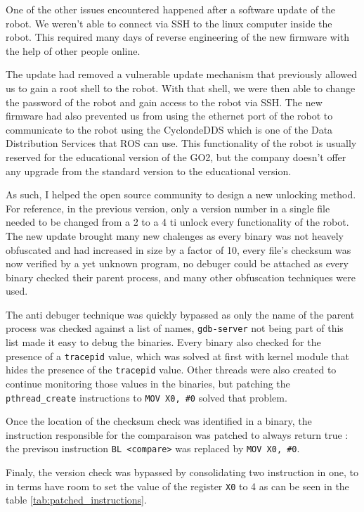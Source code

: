 \documentclass[11pt]{article}
\begin{document}
        One of the other issues encountered happened after a software update of the robot. We weren't able to connect via SSH to the linux computer inside the robot. This required many days of reverse engineering of the new firmware with the help of other people online.

        The update had removed a vulnerable update mechanism that previously allowed us to gain a root shell to the robot. With that shell, we were then able to change the password of the robot and gain access to the robot via SSH. The new firmware had also prevented us from using the ethernet port of the robot to communicate to the robot using the CyclondeDDS which is one of the Data Distribution Services that ROS can use. This functionality of the robot is usually reserved for the educational version of the GO2, but the company doesn't offer any upgrade from the standard version to the educational version.

        As such, I helped the open source community to design a new unlocking method. For reference, in the previous version, only a version number in a single file needed to be changed from a 2 to a 4 ti unlock every functionality of the robot. The new update brought many new chalenges as every binary was not heavely obfuscated and had increased in size by a factor of 10, every file's checksum was now verified by a yet unknown program, no debuger could be attached as every binary checked their parent process, and many other obfuscation techniques were used.

        The anti debuger technique was quickly bypassed as only the name of the parent process was checked against a list of names, \texttt{gdb-server} not being part of this list made it easy to debug the binaries. Every binary also checked for the presence of a \texttt{tracepid} value, which was solved at first with kernel module that hides the presence of the \texttt{tracepid} value. Other threads were also created to continue monitoring those values in the binaries, but patching the \texttt{pthread\_create} instructions to \texttt{MOV X0, \#0} solved that problem.

        Once the location of the checksum check was identified in a binary, the instruction responsible for the comparaison was patched to always return true : the previsou instruction \texttt{BL <compare>} was replaced by \texttt{MOV X0, \#0}.

        Finaly, the version check was bypassed by consolidating two instruction in one, to in terms have room to set the value of the register \texttt{X0} to 4 as can be seen in the table \ref{tab:patched_instructions}.
        
\end{document}
